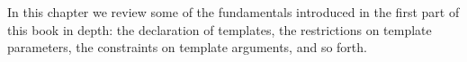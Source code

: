 In this chapter we review some of the fundamentals introduced in the first part of this book in depth: the declaration of templates, the restrictions on template parameters, the constraints on template arguments, and so forth.